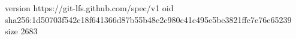 version https://git-lfs.github.com/spec/v1
oid sha256:1d50703f542c18f641366d87b55b48e2c980c41c495e5be3821ffc7e76e65239
size 2683
